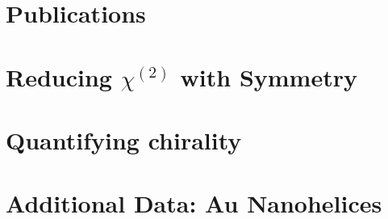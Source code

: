 \documentclass[11pt,a4paper,final]{report}
\begin{document}
\chapter*{Publications}


\bigskip \noindent {}

\bigskip \noindent {}

\bigskip \noindent {}

\bigskip \noindent {}













%


\clearpage

\appendix
\chapter{Reducing \texorpdfstring{$\chi^{(2)}$}{Lg} with Symmetry}\label{sec:appendix:rotations}

\chapter{Quantifying chirality}\label{sec:appendix:QuantifyingChirality}

\chapter{Additional Data: Au Nanohelices}\label{sec:appendix:AdditionalAuHelix}

\end{document}
